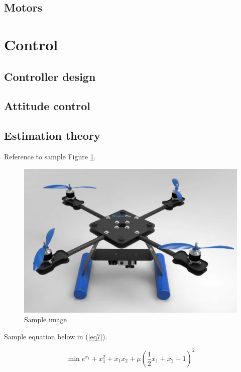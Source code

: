 \documentclass[a4paper]{article}
\begin{document}
	\subsection{Motors}

\section{Control}

	\subsection{Controller design}
	
	\subsection{Attitude control}
	
	\subsection{Estimation theory}

Reference to sample Figure \ref{fig:sampleimage}.

\begin{figure}[h]
    \centering
    \includegraphics[scale=0.4]{images/quad_rendered.jpg}
    \caption{Sample image}
    \label{fig:sampleimage}
\end{figure}

Sample equation below in (\ref{eq7}).

\begin{equation}
\min e^{x_1} + x_{1}^2 + x_{1}x_{2} + \mu (\dfrac{1}{2}x_1 + x_2 - 1)^2
\label{eq7}
\end{equation}
\end{document}
